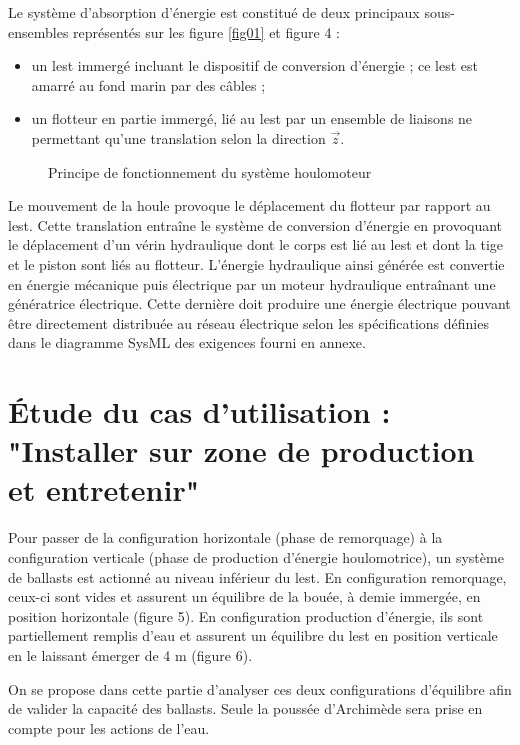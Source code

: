 Le système d'absorption d'énergie est constitué de deux principaux sous-ensembles représentés sur les figure \ref{fig01} et figure 4 :
\begin{itemize}
 \item un lest immergé incluant le dispositif de conversion d'énergie ; ce lest est amarré au fond marin par des câbles ;
 \item un flotteur en partie immergé, lié au lest par un ensemble de liaisons ne permettant qu'une translation selon la direction $\vec{z}$.
\end{itemize}

\begin{figure}[ht!]
\begin{center}
  \def\svgwidth{0.7\linewidth}
  
 \end{center}
  \caption{Principe de fonctionnement du système houlomoteur}
\label{fig04}
\end{figure}

Le mouvement de la houle provoque le déplacement du flotteur par rapport au lest. Cette translation entraîne le système de conversion d'énergie en provoquant le déplacement d'un vérin hydraulique dont le corps est lié au lest et dont la tige et le piston sont liés au flotteur. L'énergie hydraulique
ainsi générée est convertie en énergie mécanique puis électrique par un moteur hydraulique entraînant une génératrice électrique. Cette dernière doit produire une énergie électrique pouvant être directement distribuée au réseau électrique selon les spécifications définies dans le diagramme SysML des exigences fourni en annexe.

\section{Étude du cas d'utilisation : "Installer sur zone de production et entretenir"}

Pour passer de la configuration horizontale (phase de remorquage) à la configuration verticale (phase de production d'énergie houlomotrice), un système de ballasts est actionné au niveau inférieur du lest. En configuration remorquage, ceux-ci sont vides et assurent un équilibre de la bouée, à demie immergée, en position horizontale (figure 5). En configuration production
d'énergie, ils sont partiellement remplis d'eau et assurent un équilibre du lest en position verticale en le laissant émerger de 4 m (figure 6).

On se propose dans cette partie d'analyser ces deux configurations d'équilibre afin de valider la capacité des ballasts. Seule la poussée d'Archimède sera prise en compte pour les actions de l'eau.

